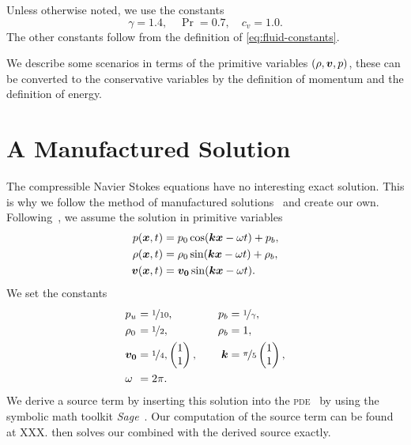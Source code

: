 Unless otherwise noted, we use the constants
\begin{equation}
  \gamma = 1.4, \quad \Pr = 0.7, \quad c_v = 1.0.
\end{equation}
The other constants follow from the definition of \cref{eq:fluid-constants}.

We describe some scenarios in terms of the primitive variables $(\rho, \bm{v}, p)$, these can be converted to the conservative variables by the definition of momentum and the definition of energy.   

\section{A Manufactured Solution}\label{sec:manufactured-solution}
The compressible Navier Stokes equations have no interesting exact solution.
This is why we follow the method of manufactured solutions~\cite{salari2000code} and create our own.
Following~\cite{dumbser2010arbitrary}, we assume the solution in primitive variables
\begin{align}\label{eq:manufactured-solution}
\begin{split}
  p(\bm{x}, t) &= p_0 \cos( \bm{k} \bm{x} - \omega t ) + p_b, \\
  \rho(\bm{x}, t) &= \rho_0 \sin (\bm{k} \bm{x} - \omega t) + \rho_b, \\
  \bm{v}(\bm{x}, t) &= \bm{v_0} \sin(\bm{k} \bm{x} - \omega t).
\end{split}
\end{align}
We set the constants
\begin{equation}
\begin{alignedat}{6}
  & p_u &&= \nicefrac{1}{10}, \qquad& p_b &= \nicefrac{1}{\gamma}, \\
  & \rho_0 &&= \nicefrac{1}{2}, \qquad& \rho_b &= 1, \\
  & \bm{v_0} &&= \nicefrac{1}{4},
  \begin{pmatrix}
    1 \\
    1
  \end{pmatrix},
  \qquad& \bm{k} &= \nicefrac{\pi}{5}
  \begin{pmatrix}
    1\\
    1
  \end{pmatrix},\\
  & \omega &&= 2 \pi.
  \end{alignedat}
\end{equation}
We derive a source term by inserting this solution into the \textsc{pde}~ by using the symbolic math toolkit \textit{Sage}~\cite{sagemath}.
Our computation of the source term can be found at XXX.
 then solves our \pde{} combined with the derived source exactly.

